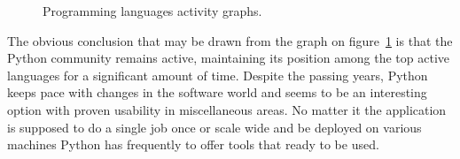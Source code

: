\begin{figure}[ht]
  \begin{center}
  \end{center}
  \caption{Programming languages activity graphs.}
  \label{fig:ohloh_lang_graph}
\end{figure}
The obvious conclusion that may be drawn from the graph on figure~\ref{fig:ohloh_lang_graph} is that the Python community remains active, maintaining its position among the top active languages for a significant amount of time. Despite the passing years, Python keeps pace with changes in the software world and seems to be an interesting option with proven usability in miscellaneous areas. No matter it the application is supposed to do a single job once or scale wide and be deployed  on various  machines Python has frequently to offer  tools that ready to be used.
 
